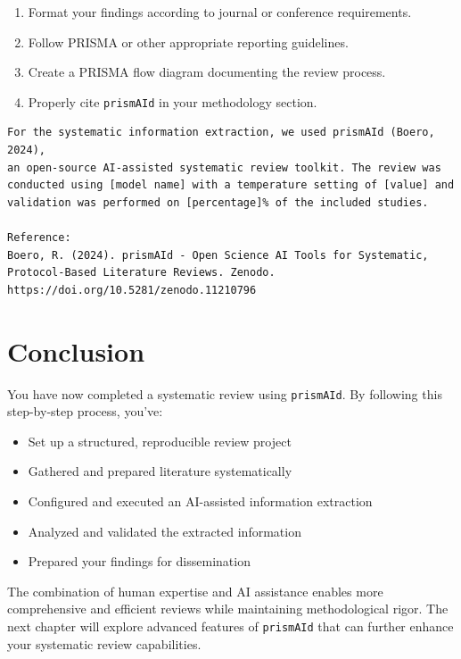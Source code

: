\begin{enumerate}
    \item Format your findings according to journal or conference requirements.
    \item Follow PRISMA or other appropriate reporting guidelines.
    \item Create a PRISMA flow diagram documenting the review process.
    \item Properly cite \texttt{prismAId} in your methodology section.
\end{enumerate}

\begin{infobox}
\begin{lstlisting}
For the systematic information extraction, we used prismAId (Boero, 2024),
an open-source AI-assisted systematic review toolkit. The review was
conducted using [model name] with a temperature setting of [value] and
validation was performed on [percentage]% of the included studies.

Reference:
Boero, R. (2024). prismAId - Open Science AI Tools for Systematic,
Protocol-Based Literature Reviews. Zenodo.
https://doi.org/10.5281/zenodo.11210796
\end{lstlisting}
\end{infobox}

\section{Conclusion}

You have now completed a systematic review using \texttt{prismAId}. By following this step-by-step process, you've:

\begin{itemize}
    \item Set up a structured, reproducible review project
    \item Gathered and prepared literature systematically
    \item Configured and executed an AI-assisted information extraction
    \item Analyzed and validated the extracted information
    \item Prepared your findings for dissemination
\end{itemize}


The combination of human expertise and AI assistance enables more comprehensive and efficient reviews while maintaining methodological rigor. The next chapter will explore advanced features of \texttt{prismAId} that can further enhance your systematic review capabilities.

